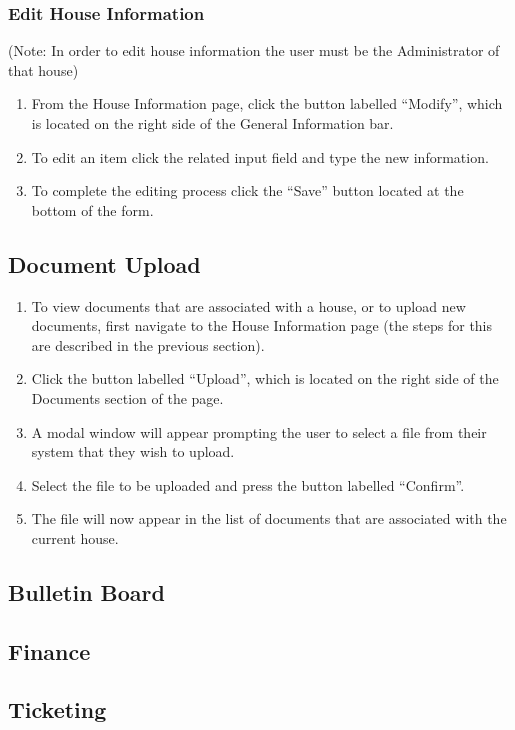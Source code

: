 \documentclass[12pt]{article}
\begin{document}
\subsubsection{Edit House Information}
(Note: In order to edit house information the user must be the Administrator of that house)
\begin{enumerate}
\item From the House Information page, click the button labelled ``Modify'', which is located on the right side of the General Information bar.
\item To edit an item click the related input field and type the new information.
\item To complete the editing process click the ``Save'' button located at the bottom of the form.
\end{enumerate}

\subsection{Document Upload} %
\begin{enumerate}
\item To view documents that are associated with a house, or to upload new documents, first navigate to the House Information page (the steps for this are described in the previous section).
\item Click the button labelled ``Upload'', which is located on the right side of the Documents section of the page.
\item A modal window will appear prompting the user to select a file from their system that they wish to upload.
\item Select the file to be uploaded and press the button labelled ``Confirm''.
\item The file will now appear in the list of documents that are associated with the current house.
\end{enumerate}

\subsection{Bulletin Board}

\subsection{Finance}

\subsection{Ticketing}
\end{document}
